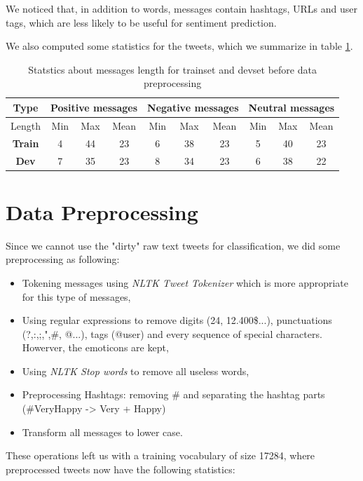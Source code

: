 \documentclass[a4paper,english,12pt]{article}
\begin{document}
We noticed that, in addition to words, messages contain hashtags, URLs and user tags, which are less likely to be useful for sentiment prediction. 

We also computed some statistics for the tweets, which we summarize in table \ref{stat}.


\begin{table}[H]\centering
	\begin{tabular}{|c|c c c|c c c|c c c|}
		\hline \textbf{Type}  & \multicolumn{3}{|c|}{\textbf{Positive messages}} & \multicolumn{3}{|c|}{\textbf{Negative messages}} & \multicolumn{3}{|c|}{\textbf{Neutral messages}}\\    \hline
		 Length & Min & Max & Mean & Min & Max & Mean & Min & Max & Mean\\   \hline
		\textbf{Train} & 4&44&23&6&38&23&5&40&23 \\
		\textbf{Dev} & 7&35&23&8&34&23&6&38&22 \\
		\hline
	\end{tabular}
	\caption{Statstics about messages length for trainset and devset before data preprocessing}
	\label{stat}
\end{table}


\section{Data Preprocessing}
Since we cannot use the "dirty" raw text tweets for classification, we did some preprocessing as following:
\begin{itemize}
	\item Tokening messages using \emph{NLTK Tweet Tokenizer} which is more appropriate for this type of messages,
	\item Using regular expressions to remove digits (24, 12.400\$...), punctuations (?,:,;,",\#, @...), tags (@user) and every sequence of special characters. Howerver, the emoticons are kept,
	\item Using \emph{NLTK Stop words} to remove all useless words,
	\item Preprocessing Hashtags: removing \# and separating the hashtag parts (\#VeryHappy -> Very + Happy)
	\item Transform all messages to lower case. 
\end{itemize}

These operations left us with a training vocabulary of size 17284, where preprocessed tweets now have the following statistics:
\end{document}
